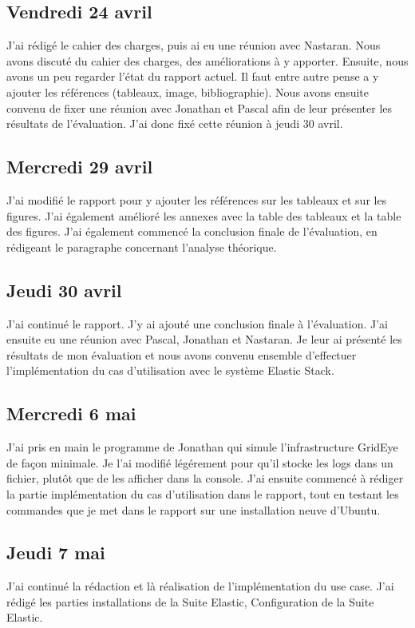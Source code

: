 \documentclass[paper=a4, fontsize=11pt]{scrartcl}
\begin{document}
\subsection{Vendredi 24 avril}
    J'ai rédigé le cahier des charges, puis ai eu une réunion avec Nastaran. Nous avons discuté du cahier des charges, des améliorations à y apporter. Ensuite, nous avons un peu regarder l'état du rapport actuel. Il faut entre autre pense a y ajouter les références (tableaux, image, bibliographie). Nous avons ensuite convenu de fixer une réunion avec Jonathan et Pascal afin de leur présenter les résultats de l'évaluation. J'ai donc fixé cette réunion à jeudi 30 avril.
\subsection{Mercredi 29 avril}
    J'ai modifié le rapport pour y ajouter les références sur les tableaux et sur les figures. J'ai également amélioré les annexes avec la table des tableaux et la table des figures. J'ai également commencé la conclusion finale de l'évaluation, en rédigeant le paragraphe concernant l'analyse théorique.
\subsection{Jeudi 30 avril}
    J'ai continué le rapport. J'y ai ajouté une conclusion finale à l'évaluation. J'ai ensuite eu une réunion avec Pascal, Jonathan et Nastaran. Je leur ai présenté les résultats de mon évaluation et nous avons convenu ensemble d'effectuer l'implémentation du cas d'utilisation avec le système Elastic Stack.
\subsection{Mercredi 6 mai}
    J'ai pris en main le programme de Jonathan qui simule l'infrastructure GridEye de façon minimale. Je l'ai modifié légérement pour qu'il stocke les logs dans un fichier, plutôt que de les afficher dans la console. J'ai ensuite commencé à rédiger la partie implémentation du cas d'utilisation dans le rapport, tout en testant les commandes que je met dans le rapport sur une installation neuve d'Ubuntu.
\subsection{Jeudi 7 mai}
    J'ai continué la rédaction et là réalisation de l'implémentation du use case. J'ai rédigé les parties installations de la Suite Elastic, Configuration de la Suite Elastic.
\end{document}
